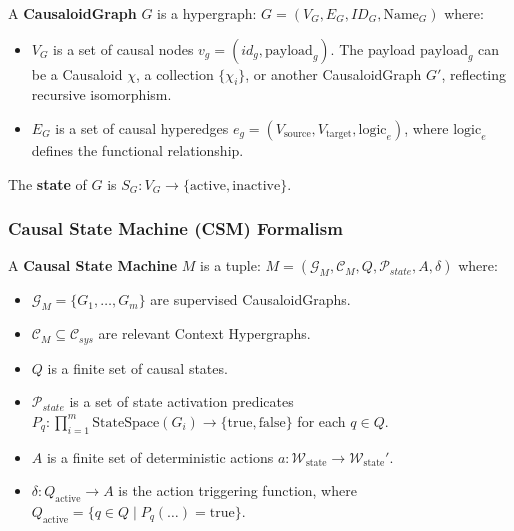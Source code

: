 A \textbf{CausaloidGraph} $ G $ is a hypergraph: $ G = (V_G, E_G, ID_G, \text{Name}_G) $
where:
\begin{itemize}
    \item $ V_G $ is a set of causal nodes $v_g = (id_g, \text{payload}_g)$. The payload $\text{payload}_g$ can be a Causaloid $\chi$, a collection $\{\chi_i\}$, or another CausaloidGraph $G'$, reflecting recursive isomorphism.
    \item $ E_G $ is a set of causal hyperedges $e_g = (V_{\text{source}}, V_{\text{target}}, \text{logic}_e)$, where $\text{logic}_e$ defines the functional relationship.
\end{itemize}
The \textbf{state} of $ G $ is $ S_G: V_G \to \{\text{active}, \text{inactive}\} $.

\subsubsection{Causal State Machine (CSM) Formalism}
\label{subsubsec:csm_formalism} 

A \textbf{Causal State Machine} $ M $ is a tuple: $ M = (\mathcal{G}_{M}, \mathcal{C}_{M}, Q, \mathcal{P}_{state}, A, \delta) $
where:
\begin{itemize}
    \item $ \mathcal{G}_{M} = \{G_1, \dots, G_m\} $ are supervised CausaloidGraphs.
    \item $ \mathcal{C}_{M} \subseteq \mathcal{C}_{sys} $ are relevant Context Hypergraphs.
    \item $ Q $ is a finite set of causal states.
    \item $ \mathcal{P}_{state} $ is a set of state activation predicates $ P_q: \prod_{i=1}^{m} \text{StateSpace}(G_i) \to \{\text{true}, \text{false}\} $ for each $q \in Q$.
    \item $ A $ is a finite set of deterministic actions $a: \mathcal{W}_{\text{state}} \to \mathcal{W}_{\text{state}}'$.
    \item $ \delta: Q_{\text{active}} \to A $ is the action triggering function, where $ Q_{\text{active}} = \{ q \in Q \mid P_q(\dots) = \text{true} \} $.
\end{itemize}

